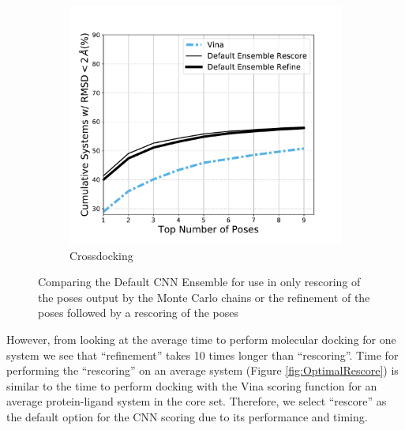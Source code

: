 \documentclass[journal=jcisd8,manuscript=article]{achemso}
\begin{document}
\begin{figure}
\begin{subfigure}[b]{0.48\textwidth}
		\includegraphics[width=\textwidth]{figures/crossdocking/rescore_vs_refine_line.pdf} 
		\caption{Crossdocking}
		\label{fig:CompareRescoreRefineCrossdock}
        \end{subfigure}    
	\caption{Comparing the Default CNN Ensemble for use in only rescoring of the poses output by the Monte Carlo chains or the refinement of the poses followed by a rescoring of the poses}
	\label{fig:CompareRescoreRefine}
\end{figure}    

However, from looking at the average time to perform molecular docking for one system we see that ``refinement'' takes 10 times longer than ``rescoring''. Time for performing the ``rescoring'' on an average system (Figure \ref{fig:OptimalRescore}) is similar to the time to perform docking with the Vina scoring function for an average protein-ligand system in the core set. Therefore, we select ``rescore'' as the default option for the CNN scoring due to its performance and timing.
\end{document}
